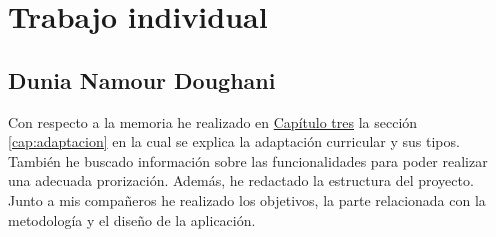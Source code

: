 \chapter{Trabajo individual}
\label{cap:trabajo_individual}

\section{Dunia Namour Doughani}
Con respecto a la memoria he realizado en {\hyperref[cap:estadoDelArte]{Capítulo tres}} la sección \ref{cap:adaptacion} en la cual se explica la adaptación curricular y sus tipos. También he buscado información sobre las funcionalidades para poder realizar una adecuada prorización. Además, he redactado la estructura del proyecto. Junto a mis compañeros he realizado los objetivos, la parte relacionada con la metodología y el diseño de la aplicación.